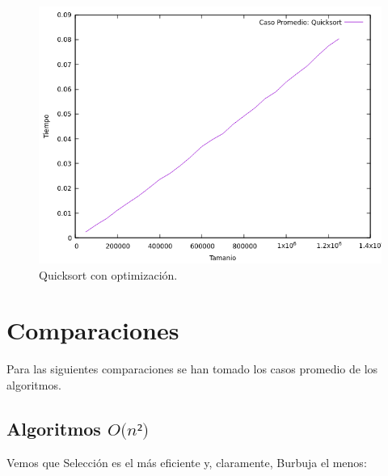 \documentclass[a4paper,12pt,twoside]{article} %
\begin{document}
\begin{itemize}
\begin{figure}[h]
\begin{center}
  	\includegraphics[scale=0.8]{quicksort_me_co.png}
  	\caption{Quicksort con optimización.}
  	
  \end{center}
\end{figure}
	
\end{itemize}
\newpage
	

\section{Comparaciones}

	Para las siguientes comparaciones se han tomado los casos promedio de los algoritmos.

	\subsection{Algoritmos $\textit{O(n²)}$}
	
	Vemos que Selección es el más eficiente y, claramente, Burbuja el menos:
	
\end{document}
